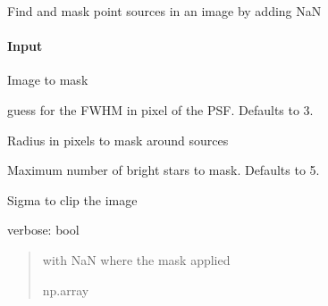 \documentclass[letterpaper,10pt,english]{sphinxmanual}
\begin{document}
\begin{fulllineitems}
\label{\detokenize{api/pymusepipe:pymusepipe.util_image.mask_point_sources}}
\pysigstartsignatures
{}
\pysigstopsignatures
\sphinxAtStartPar
Find and mask point sources in an image by adding NaN


\paragraph{Input}
\label{\detokenize{api/pymusepipe:id152}}\begin{description}
\sphinxAtStartPar
Image to mask

\sphinxAtStartPar
guess for the FWHM in pixel of the PSF. Defaults to 3.

\sphinxAtStartPar
Radius in pixels to mask around sources

\sphinxAtStartPar
Maximum number of bright stars to mask. Defaults to 5.

\sphinxAtStartPar
Sigma to clip the image

\end{description}

\sphinxAtStartPar
verbose: bool
\begin{quote}\begin{description}
\sphinxAtStartPar
{} \textendash{} with NaN where the mask applied

\sphinxAtStartPar
np.array

\end{description}\end{quote}

\end{fulllineitems}

\end{document}
